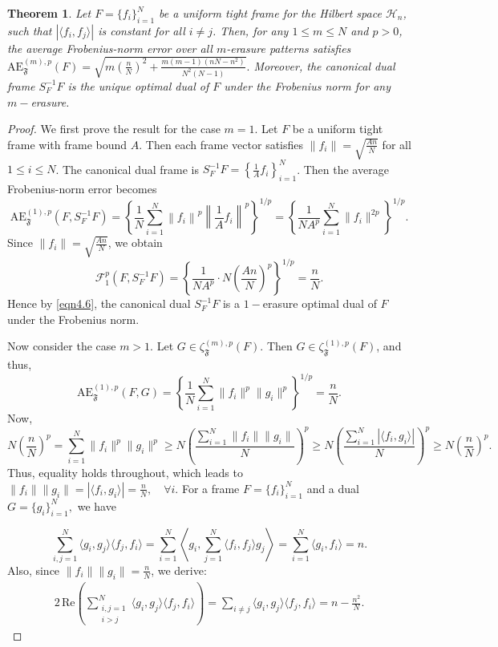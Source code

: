 \documentclass[final,1p,times]{elsarticle}
\newtheorem{thm}{Theorem}[section]
\begin{document}
     \begin{thm}\label{thm3point4}
Let \( F = \{f_i\}_{i=1}^N \) be a uniform tight frame for the Hilbert space \( \mathcal{H}_n \), such that \( |\langle f_i, f_j \rangle| \) is constant for all \( i \neq j \). Then, for any \( 1 \leq m \leq N \) and \( p > 0 \), the average Frobenius-norm error over all \( m \)-erasure patterns satisfies $\mathrm{AE}_{\mathfrak{F}}^{(m),p}(F) = \sqrt{m\left(\frac{n}{N}\right)^2 + \frac{m(m-1)(nN - n^2)}{N^2(N-1)}}. $
Moreover, the canonical dual frame \( S_F^{-1} F \) is the unique optimal dual of \( F \) under the Frobenius norm for any \( m-\)erasure. 
\end{thm}

     
   \begin{proof}
We first prove the result for the case \( m = 1 \). Let \( F \) be a uniform tight frame with frame bound \( A \). Then each frame vector satisfies \( \|f_i\| = \sqrt{\frac{An}{N}} \) for all \( 1 \leq i \leq N \). The canonical dual frame is \( S_F^{-1}F = \left\{ \frac{1}{A}f_i \right\}_{i=1}^N \). Then the average Frobenius-norm error becomes
\[
\mathrm{AE}_{\mathfrak{F}}^{(1),p}(F, S_F^{-1}F) = \left\{ \frac{1}{N} \sum_{i=1}^N \left\|f_i\right\|^p \left\|\frac{1}{A} f_i \right\|^p \right\}^{1/p} = \left\{ \frac{1}{N A^p} \sum_{i=1}^N \|f_i\|^{2p} \right\}^{1/p}.
\]
Since \( \|f_i\| = \sqrt{\frac{An}{N}} \), we obtain
\[
\mathcal{F}_1^p(F, S_F^{-1}F) = \left\{ \frac{1}{N A^p} \cdot N \left( \frac{An}{N} \right)^p \right\}^{1/p} = \frac{n}{N}.
\]
Hence by \eqref{eqn4.6}, the canonical dual $S_F^{-1}F$ is a $1-$erasure optimal dual of \( F \) under the Frobenius norm.

Now consider the case \( m > 1 \). Let \( G \in \zeta_{\mathfrak{F}}^{(m),p}(F) \). Then \( G \in \zeta_{\mathfrak{F}}^{(1),p}(F) \), and thus,
\[
\mathrm{AE}_{\mathfrak{F}}^{(1),p}(F, G)=\left\{ \frac{1}{N} \sum_{i=1}^N \|f_i\|^p \|g_i\|^p \right\}^{1/p} = \frac{n}{N}.
\]
Now,
\[
N \left(\frac{n}{N}\right)^p = \sum_{i=1}^N \|f_i\|^p \|g_i\|^p \geq N \left( \frac{\sum_{i=1}^N \|f_i\| \|g_i\|}{N} \right)^p \geq N \left( \frac{\sum_{i=1}^N |\langle f_i, g_i \rangle|}{N} \right)^p \geq N \left( \frac{n}{N} \right)^p.
\]
Thus, equality holds throughout, which leads to $\|f_i\| \|g_i\| = |\langle f_i, g_i \rangle| = \frac{n}{N}, \quad \forall i.$ For a frame $F=\{f_i\}_{i=1}^N$ and a dual $G=\{g_i\}_{i=1}^N,$ we have

\[
\sum_{i,j=1}^N \langle g_i, g_j \rangle \langle f_j, f_i \rangle = \sum_{i=1}^N \left\langle g_i, \sum_{j=1}^N \langle f_i, f_j \rangle g_j \right\rangle = \sum_{i=1}^N \langle g_i, f_i \rangle = n.
\]
Also, since \( \|f_i\| \|g_i\| = \frac{n}{N} \), we derive:
\begin{align} \label{equation3point8}
2\,\text{Re} \left( \sum_{\substack{i,j=1 \\ i > j}}^N \langle g_i, g_j \rangle \langle f_j, f_i \rangle \right) = \sum_{i \neq j} \langle g_i, g_j \rangle \langle f_j, f_i \rangle = n - \frac{n^2}{N}.
\end{align}


\end{proof}
\end{document}
